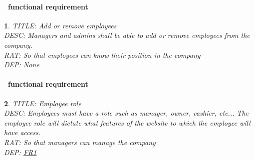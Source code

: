 \documentclass{scrreprt}
\theoremstyle{funreq}
\newtheorem{funreq}{}
\newcommand*{\reqref}[1]{\hyperref[#1]{FR\ref*{#1}}}
\begin{document}
	\paragraph[]{\Subsectionname ~functional requirement }
	\begin{funreq}
		\label{employee_addremove}
		TITLE: Add or remove employees\\
		DESC: Managers and admins shall be able to add or remove employees from the company.  \\
		RAT: So that employees can know their position in the company\\
		DEP: None
	\end{funreq}
	
	\paragraph[]{\Subsectionname ~functional requirement }
	\begin{funreq}
		\label{employee_role}
		TITLE: Employee role\\
		DESC: Employees must have a role such as manager, owner, cashier, etc...  The employee role will dictate what features of the website to which the employee will have access.\\
		RAT: So that managers can manage the company\\
		DEP: \reqref{employee_addremove}
	\end{funreq}

\end{document}
